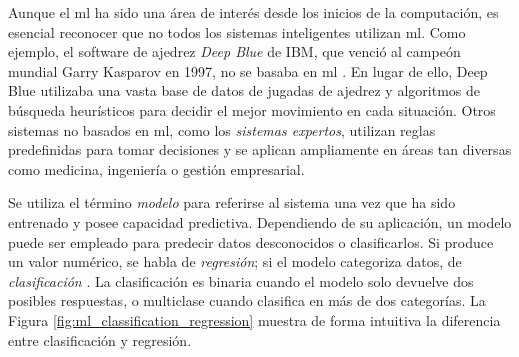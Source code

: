 Aunque el \gls{ml} ha sido una área de interés desde los inicios de la computación, es esencial reconocer que no todos los sistemas inteligentes utilizan \gls{ml}. Como ejemplo, el software de ajedrez \emph{Deep Blue} de IBM, que venció al campeón mundial Garry Kasparov en 1997, no se basaba en \gls{ml} \citep{campbellDeepBlue2002}. En lugar de ello, {Deep Blue} utilizaba una vasta base de datos de jugadas de ajedrez y algoritmos de búsqueda heurísticos para decidir el mejor movimiento en cada situación. Otros sistemas no basados en \gls{ml}, como los \emph{sistemas expertos}, utilizan reglas predefinidas para tomar decisiones y se aplican ampliamente en áreas tan diversas como medicina, ingeniería o gestión empresarial.



Se utiliza el término \emph{modelo} para referirse al sistema una vez que ha sido entrenado y posee capacidad predictiva. Dependiendo de su aplicación, un modelo puede ser empleado para predecir datos desconocidos o clasificarlos. Si produce un valor numérico, se habla de \emph{regresión}; si el modelo categoriza datos, de \emph{clasificación} \citep{zhang2023dive}. La clasificación es binaria cuando el modelo solo devuelve dos posibles respuestas, o multiclase cuando clasifica en más de dos categorías. La Figura \ref{fig:ml_classification_regression} muestra de forma intuitiva la diferencia entre clasificación y regresión.


